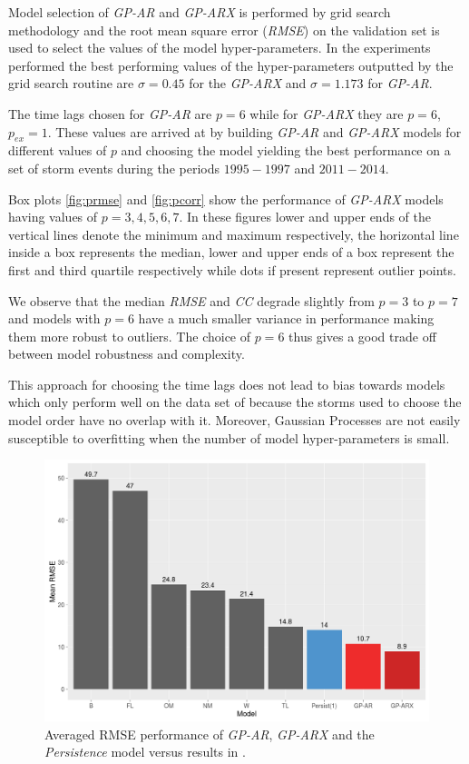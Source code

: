 \documentclass[referee,a4paper,12pt,traditabstract]{swsc}
\begin{document}
\begin{linenumbers}
Model selection of \emph{GP-AR} and \emph{GP-ARX} is performed by grid search methodology and the root mean square error (\emph{RMSE}) on the validation set is used to select the values of the model hyper-parameters. In the experiments performed the best performing values of the hyper-parameters outputted by the grid search routine are $\sigma = 0.45$ for the \emph{GP-ARX} and $\sigma = 1.173$ for \emph{GP-AR}. 

The time lags chosen for \emph{GP-AR} are $p = 6$ while for \emph{GP-ARX} they are $p=6$, $p_{ex} = 1$. These values are arrived at by building \emph{GP-AR} and \emph{GP-ARX} models for different values of $p$ and choosing the model yielding the best performance on a set of storm events during the periods $1995-1997$ and $2011-2014$. 

Box plots \ref{fig:prmse} and \ref{fig:pcorr} show the performance of \emph{GP-ARX} models having values of $p={3,4,5,6,7}$. In these figures lower and upper ends of the vertical lines denote the minimum and maximum respectively, the horizontal line inside a box represents the median, lower and upper ends of a box represent the first and third quartile respectively while dots if present represent outlier points. 

We observe that the median \emph{RMSE} and \emph{CC} degrade slightly from $p = 3$ to $p = 7$ and models with $p = 6$ have a much smaller variance in performance making them more robust to outliers. The choice of $p = 6$ thus gives a good trade off between model robustness and complexity. 

This approach for choosing the time lags does not lead to bias towards models which only perform well on the data set of \citet{Ji2012} because the storms used to choose the model order have no overlap with it. Moreover, Gaussian Processes are not easily susceptible to overfitting when the number of model hyper-parameters is small.

\begin{figure}
   \centering
   \includegraphics[width=\textwidth]{Compare_RMSE.png}
      \caption{Averaged RMSE performance of \emph{GP-AR}, \emph{GP-ARX} and the \emph{Persistence} model versus results in \citet{Ji2012}.}
         \label{fig:rmse}
 \end{figure}


\end{linenumbers}
\end{document}
